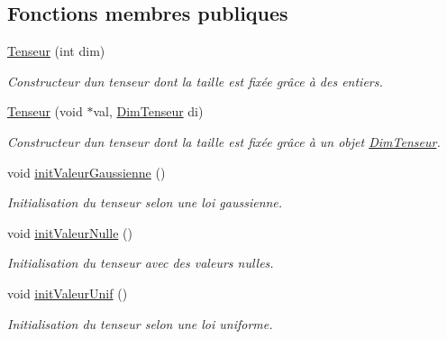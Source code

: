 \subsection*{Fonctions membres publiques}
\begin{DoxyCompactItemize}
\item 
\hyperlink{class_tenseur_a936de784ba6d02e78456091b857c90d2}{Tenseur} (int dim)
\begin{DoxyCompactList}\small\item\em Constructeur d\textquotesingle{}un tenseur dont la taille est fixée grâce à des entiers. \end{DoxyCompactList}\item 
\mbox{\label{class_tenseur_a6a39e895e161502a104b28e108d5923e}} 
\hyperlink{class_tenseur_a6a39e895e161502a104b28e108d5923e}{Tenseur} (void $\ast$val, \hyperlink{class_dim_tenseur}{Dim\+Tenseur} di)
\begin{DoxyCompactList}\small\item\em Constructeur d\textquotesingle{}un tenseur dont la taille est fixée grâce à un objet \hyperlink{class_dim_tenseur}{Dim\+Tenseur}. \end{DoxyCompactList}\item 
\mbox{\label{class_tenseur_ad8c217e97370fbe4fabe47c792f976a0}} 
void \hyperlink{class_tenseur_ad8c217e97370fbe4fabe47c792f976a0}{init\+Valeur\+Gaussienne} ()
\begin{DoxyCompactList}\small\item\em Initialisation du tenseur selon une loi gaussienne. \end{DoxyCompactList}\item 
\mbox{\label{class_tenseur_ad56d975cf6954e6e38116b82bc4aca3a}} 
void \hyperlink{class_tenseur_ad56d975cf6954e6e38116b82bc4aca3a}{init\+Valeur\+Nulle} ()
\begin{DoxyCompactList}\small\item\em Initialisation du tenseur avec des valeurs nulles. \end{DoxyCompactList}\item 
\mbox{\label{class_tenseur_aba025d1b39fd6de6dba44b9ed4bc865a}} 
void \hyperlink{class_tenseur_aba025d1b39fd6de6dba44b9ed4bc865a}{init\+Valeur\+Unif} ()
\begin{DoxyCompactList}\small\item\em Initialisation du tenseur selon une loi uniforme. \end{DoxyCompactList}\item 

\end{DoxyCompactItemize}
